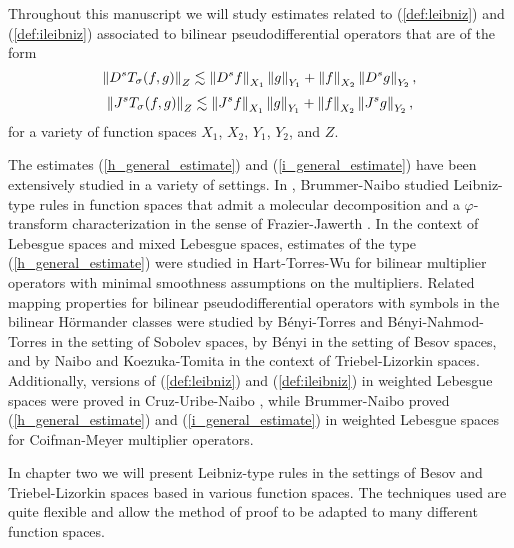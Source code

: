 Throughout this manuscript we will study estimates related to (\ref{def:leibniz}) and (\ref{def:ileibniz}) associated to bilinear pseudodifferential operators that are of the form 
\begin{equation}\label{h_general_estimate}
\left\|D^s T_\sigma(f,g)\right\|_{Z} \lesssim \left\|D^sf\right\|_{X_1}\left\|g\right\|_{Y_1} + \left\|f\right\|_{X_2}\left\|D^s g\right\|_{Y_2} ,
\end{equation}
\begin{equation}\label{i_general_estimate}
\left\|J^sT_\sigma(f,g)\right\|_{Z} \lesssim \left\|J^sf\right\|_{X_1}\left\|g\right\|_{Y_1} + \left\|f\right\|_{X_2}\left\|J^sg\right\|_{Y_2} ,
\end{equation}
for a variety of function spaces $X_1$, $X_2$, $Y_1$, $Y_2$, and $Z$.


The estimates (\ref{h_general_estimate}) and (\ref{i_general_estimate}) have been extensively studied in a variety of settings. In \cite{MR3750234}, Brummer-Naibo studied Leibniz-type rules in function spaces that admit a molecular decomposition and a $\varphi$-transform characterization in the sense of Frazier-Jawerth \cite{MR808825, MR1070037}. In the context of Lebesgue spaces and mixed Lebesgue spaces, estimates of the type (\ref{h_general_estimate}) were studied in Hart-Torres-Wu \cite{HTW} for bilinear multiplier operators with minimal smoothness assumptions on the multipliers. Related mapping properties for bilinear pseudodifferential operators with symbols in the bilinear H\"ormander classes were studied by B\'enyi-Torres \cite{MR1986065} and B\'enyi-Nahmod-Torres \cite{MR2250054} in the setting of Sobolev spaces, by B\'enyi \cite{MR1996120} in the setting of Besov spaces, and by Naibo \cite{MR3393696} and Koezuka-Tomita \cite{MR3750316} in the context of Triebel-Lizorkin spaces. Additionally, versions of (\ref{def:leibniz}) and (\ref{def:ileibniz}) in weighted Lebesgue spaces were proved in Cruz-Uribe-Naibo \cite{MR3513582}, while Brummer-Naibo \cite{BrNa2017} proved (\ref{h_general_estimate}) and (\ref{i_general_estimate}) in weighted Lebesgue spaces for Coifman-Meyer multiplier operators. 

In chapter two we will present Leibniz-type rules in the settings of Besov and Triebel-Lizorkin spaces based in various function spaces. The techniques used are quite flexible and allow the method of proof to be adapted to many different function spaces. 

